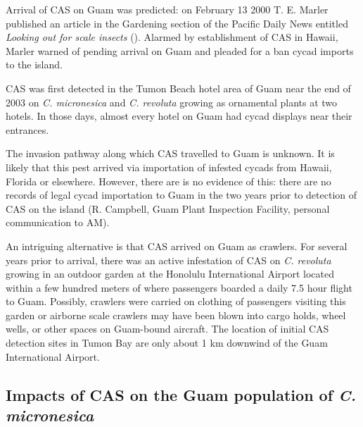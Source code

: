 \documentclass[12pt,letterpaper,english,bibliography=totocnumbered, abstract=on]{scrartcl}
\begin{document}
Arrival of CAS on Guam was predicted: on February 13 2000 T. E. Marler published an article in the Gardening section of the Pacific Daily News entitled \textit{Looking out for scale insects} (\cite{haynesExoticInvasivePest2005}). Alarmed by establishment of CAS in Hawaii, Marler warned of pending arrival on Guam and pleaded for a ban cycad imports to the island. 

CAS was first detected in the Tumon Beach hotel area of Guam near the end of 2003 on \textit{C. micronesica} and \textit{C. revoluta} growing as ornamental plants at two hotels. In those days, almost every hotel on Guam had cycad displays near their entrances.

The invasion pathway along which CAS travelled to Guam is unknown.
It is likely that this pest arrived via importation of infested cycads from Hawaii, Florida or elsewhere. However, there are is no evidence of this: there are no records of legal cycad importation to Guam in the two years prior to detection of CAS on the island (R. Campbell, Guam Plant Inspection Facility, personal communication to AM).  

An intriguing alternative is that CAS arrived on Guam as crawlers. For several years prior to arrival, there was an active infestation of CAS on \textit{C. revoluta} growing in an outdoor garden at the Honolulu International Airport located within a few hundred meters of where passengers boarded a daily 7.5 hour flight to Guam. Possibly, crawlers were carried on clothing of passengers visiting this garden or airborne scale crawlers may have been blown into cargo holds, wheel wells, or other spaces on Guam-bound aircraft. The location of initial CAS detection sites in Tumon Bay are only about 1 km downwind of the Guam International Airport.


\subsection{Impacts of CAS on the Guam population of \textit{C. micronesica}}
\end{document}
